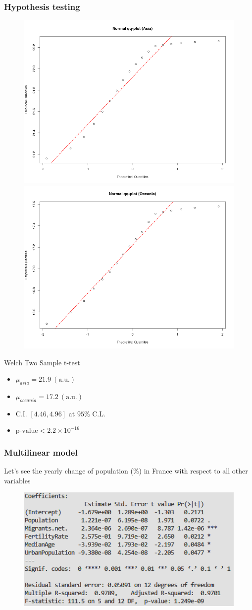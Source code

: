 \documentclass[
	11pt, %
]{beamer}
\begin{document}
\begin{frame}
	\frametitle{Hypothesis testing}
	\begin{figure}
		\includegraphics[width=.45\textwidth]{qqnorm_asia.png}
		\includegraphics[width=.45\textwidth]{qqnorm_oceania.png}
	\end{figure}
	\begin{exampleblock}{Welch Two Sample t-test}
		\begin{itemize}
			\item $\mu_{asia} = 21.9 \ \left(\text{a.u.}\right)$
			\item $\mu_{oceania} = 17.2 \ \left(\text{a.u.}\right)$
			\item C.I. $\left[4.46, 4.96\right]$ at $95\%$ C.L.
			\item $\text{p-value} < 2.2 \times 10^{-16}$
		\end{itemize}
	\end{exampleblock}
\end{frame}

\begin{frame}
	\frametitle{Multilinear model}
	Let's see the yearly change of population (\%) in France with respect to all other variables
	\begin{figure}
		\includegraphics[width=.75\textwidth]{france.png}
	\end{figure}
\end{frame}
\end{document}
